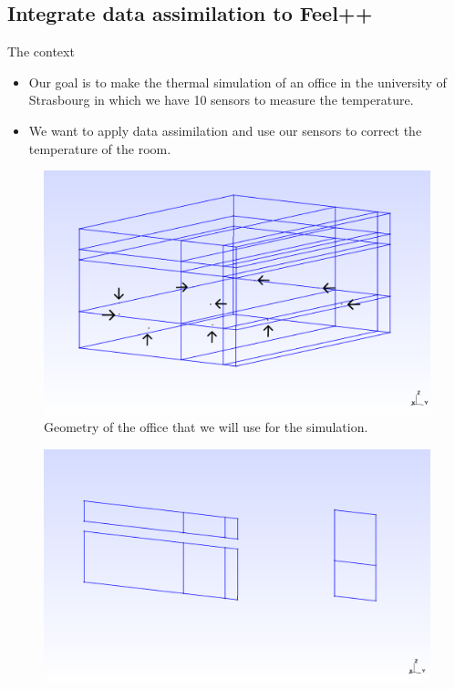 \subsection{Integrate data assimilation to Feel++}
\begin{frame}[allowframebreaks]{The context}
\begin{itemize}
    \item Our goal is to make the thermal simulation of an office in the university of Strasbourg in which we have 10 sensors to measure the temperature.\\
    \item We want to apply data assimilation and use our sensors to correct the temperature of the room.
\end{itemize}

\begin{minipage}{0.48\linewidth}
    \begin{figure}
        \centering
        \includegraphics[width=\linewidth]{"images/enkf/Maillage_1.png"}
        \caption{Geometry of the office that we will use for the simulation.}
    \end{figure}
\end{minipage} \;
\begin{minipage}{0.48\linewidth}
    \begin{figure}
        \centering
        \includegraphics[width=\linewidth]{"images/enkf/Maillage_2.png"}

\end{figure}
\end{minipage}
\end{frame}

